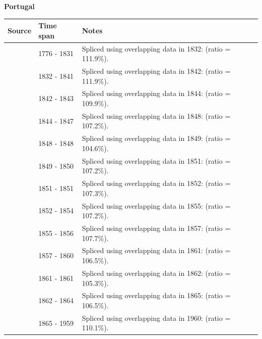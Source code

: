 \documentclass[12pt,a4paper,landscape]{article}
\begin{document}
\begin{adjustbox}{max totalsize={\paperwidth}{\paperheight},center}
\begin{minipage}[t][\textheight][t]{\textwidth}
\vspace*{0.5cm}
{}
\begin{center}
{\Large\bfseries Portugal}
\end{center}
\vspace{0.5cm}
\begin{table}[H]
\centering
\small
\begin{tabular}{|l|l|l|}
\hline
\textbf{Source} & \textbf{Time span} & \textbf{Notes} \\
\hline
\rowcolor{white}\cite{CS1_PRT}& 1776 - 1831 &Spliced using overlapping data in 1832: (ratio = 111.9\%).\\
\rowcolor{lightgray}\cite{Tena}& 1832 - 1841 &Spliced using overlapping data in 1842: (ratio = 111.9\%).\\
\rowcolor{white}\cite{CS1_PRT}& 1842 - 1843 &Spliced using overlapping data in 1844: (ratio = 109.9\%).\\
\rowcolor{lightgray}\cite{Tena}& 1844 - 1847 &Spliced using overlapping data in 1848: (ratio = 107.2\%).\\
\rowcolor{white}\cite{CS1_PRT}& 1848 - 1848 &Spliced using overlapping data in 1849: (ratio = 104.6\%).\\
\rowcolor{lightgray}\cite{Tena}& 1849 - 1850 &Spliced using overlapping data in 1851: (ratio = 107.2\%).\\
\rowcolor{white}\cite{CS1_PRT}& 1851 - 1851 &Spliced using overlapping data in 1852: (ratio = 107.3\%).\\
\rowcolor{lightgray}\cite{Tena}& 1852 - 1854 &Spliced using overlapping data in 1855: (ratio = 107.2\%).\\
\rowcolor{white}\cite{CS1_PRT}& 1855 - 1856 &Spliced using overlapping data in 1857: (ratio = 107.7\%).\\
\rowcolor{lightgray}\cite{Tena}& 1857 - 1860 &Spliced using overlapping data in 1861: (ratio = 106.5\%).\\
\rowcolor{white}\cite{CS1_PRT}& 1861 - 1861 &Spliced using overlapping data in 1862: (ratio = 105.3\%).\\
\rowcolor{lightgray}\cite{Tena}& 1862 - 1864 &Spliced using overlapping data in 1865: (ratio = 106.5\%).\\
\rowcolor{white}\cite{CS1_PRT}& 1865 - 1959 &Spliced using overlapping data in 1960: (ratio = 110.1\%).\\

\end{tabular}
\end{table}
\end{minipage}
\end{adjustbox}
\end{document}
